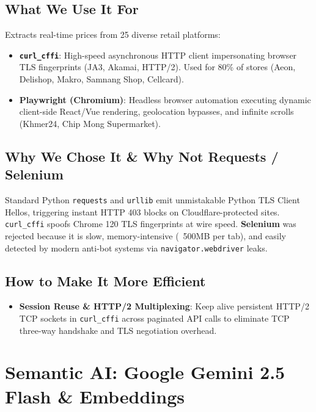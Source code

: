 \documentclass[a4paper, 11pt]{article}
\begin{document}
\subsection{What We Use It For}
Extracts real-time prices from 25 diverse retail platforms:
\begin{itemize}[leftmargin=*]
    \item \textbf{\texttt{curl\_cffi}}: High-speed asynchronous HTTP client impersonating browser TLS fingerprints (JA3, Akamai, HTTP/2). Used for 80\% of stores (Aeon, Delishop, Makro, Samnang Shop, Cellcard).
    \item \textbf{Playwright (Chromium)}: Headless browser automation executing dynamic client-side React/Vue rendering, geolocation bypasses, and infinite scrolls (Khmer24, Chip Mong Supermarket).
\end{itemize}

\subsection{Why We Chose It \& Why Not Requests / Selenium}
Standard Python \texttt{requests} and \texttt{urllib} emit unmistakable Python TLS Client Hellos, triggering instant HTTP 403 blocks on Cloudflare-protected sites. \texttt{curl\_cffi} spoofs Chrome 120 TLS fingerprints at wire speed. \textbf{Selenium} was rejected because it is slow, memory-intensive (~500MB per tab), and easily detected by modern anti-bot systems via \texttt{navigator.webdriver} leaks.

\subsection{How to Make It More Efficient}
\begin{itemize}[leftmargin=*]
    \item \textbf{Session Reuse \& HTTP/2 Multiplexing}: Keep alive persistent HTTP/2 TCP sockets in \texttt{curl\_cffi} across paginated API calls to eliminate TCP three-way handshake and TLS negotiation overhead.
\end{itemize}

\section{Semantic AI: Google Gemini 2.5 Flash \& Embeddings}
\end{document}
